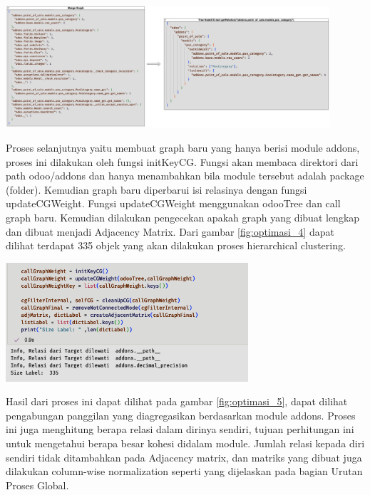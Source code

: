 \begin{center}
	\includegraphics[width=12cm]{img/bab_4/optimisasi_3.png}
	\label{fig:optimasi_3}
\end{center}

Proses selanjutnya yaitu membuat graph baru yang hanya berisi module addons, proses ini dilakukan oleh fungsi initKeyCG. Fungsi akan membaca direktori dari path odoo/addons dan hanya menambahkan bila module tersebut adalah package (folder). Kemudian graph baru diperbarui isi relasinya dengan fungsi updateCGWeight. Fungsi updateCGWeight menggunakan odooTree dan call graph baru. Kemudian dilakukan pengecekan apakah graph yang dibuat lengkap dan dibuat menjadi Adjacency Matrix.  Dari gambar \ref{fig:optimasi_4} dapat dilihat terdapat 335 objek yang akan dilakukan proses hierarchical clustering.

\begin{center}
	\includegraphics[width=9cm]{img/bab_4/optimisasi_4.png}
	\label{fig:optimasi_4}
\end{center}

Hasil dari proses ini dapat dilihat pada gambar \ref{fig:optimasi_5}, dapat dilihat pengabungan panggilan yang diagregasikan berdasarkan module addons. Proses ini juga menghitung berapa relasi dalam dirinya sendiri, tujuan perhitungan ini untuk mengetahui berapa besar kohesi didalam module. Jumlah relasi kepada diri sendiri tidak ditambahkan pada Adjacency matrix, dan matriks yang dibuat juga dilakukan column-wise normalization seperti yang dijelaskan pada bagian Urutan Proses Global.  

